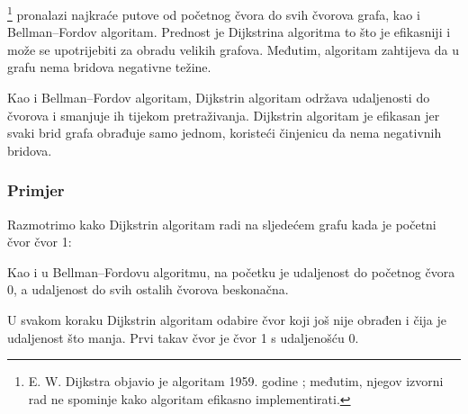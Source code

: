
\footnote{E. W. Dijkstra objavio je algoritam 1959. godine \cite{dij59};
međutim, njegov izvorni rad ne spominje kako algoritam efikasno implementirati.}
pronalazi najkraće
putove od početnog čvora do svih čvorova grafa,
kao i Bellman–Fordov algoritam.
Prednost je Dijkstrina algoritma to što je
efikasniji i može se upotrijebiti za
obradu velikih grafova.
Međutim, algoritam zahtijeva da u grafu
nema bridova negativne težine.

Kao i Bellman–Fordov algoritam,
Dijkstrin algoritam održava udaljenosti
do čvorova i smanjuje ih tijekom pretraživanja.
Dijkstrin algoritam je efikasan jer
svaki brid grafa obrađuje
samo jednom, koristeći činjenicu
da nema negativnih bridova.

\subsubsection{Primjer}

Razmotrimo kako Dijkstrin algoritam
radi na sljedećem grafu kada je
početni čvor čvor 1:
\begin{center}
\end{center}
Kao i u Bellman–Fordovu algoritmu,
na početku je udaljenost do početnog čvora 0,
a udaljenost do svih ostalih čvorova beskonačna.

U svakom koraku Dijkstrin algoritam odabire čvor
koji još nije obrađen i čija je udaljenost
što manja.
Prvi takav čvor je čvor 1 s udaljenošću 0.

